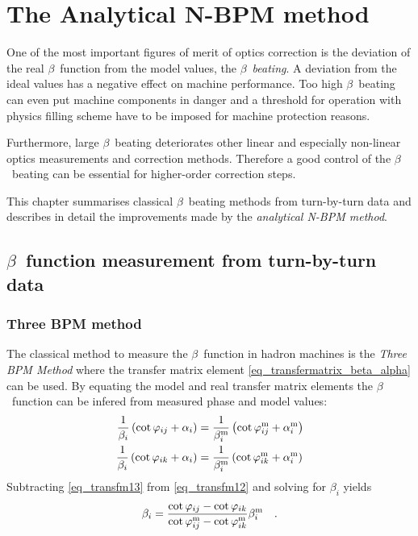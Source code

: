 \chapter{The Analytical N-BPM method}

\begin{chapterinfo}
One of the most important figures of merit of optics correction is the deviation of the real $\beta$~function
from the model values,
the $\beta$~\emph{beating}. A deviation from the ideal values has a negative effect on machine performance.
Too high $\beta$~beating can even put machine components in danger and a threshold for operation with
physics filling scheme have to be imposed for machine protection reasons.

Furthermore, large $\beta$~beating deteriorates other linear and especially non-linear optics measurements
and correction methods. Therefore a good control of the $\beta$~beating can be essential for higher-order
correction steps.

This chapter summarises classical $\beta$~beating methods from turn-by-turn data and describes in
detail the improvements made by the \emph{analytical N-BPM method}.
\end{chapterinfo}

\section{$\beta$~function measurement from turn-by-turn data}

\subsection{Three BPM method}

The classical method to measure the $\beta$~function in hadron machines is the \emph{Three BPM Method}
where the transfer matrix element \eqref{eq_transfermatrix_beta_alpha} can be used. By equating
the model and real transfer matrix elements the $\beta$~function can be infered from measured phase
and model values:
\begin{align}
    \frac{1}{\beta_i} \left( \cot\varphi_{ij} + \alpha_i\right)
    &= \frac{1}{\beta^\text{m}_i} \left(\cot\varphi_{ij}^\text{m} + \alpha_i^\text{m}\right)
    \label{eq_transfm12}\\
    \frac{1}{\beta_i} \left( \cot\varphi_{ik} + \alpha_i\right)
    &= \frac{1}{\beta^\text{m}_i} \left(\cot\varphi_{ik}^\text{m} + \alpha_i^\text{m}\right)
    \label{eq_transfm13}
\end{align}
Subtracting \eqref{eq_transfm13} from \eqref{eq_transfm12} and solving for $\beta_i$ yields
\begin{equation}
    \beta_i = \frac{\cot\varphi_{ij} - \cot{\varphi_{ik}}}{\cot\varphi_{ij}^\text{m} - \cot{\varphi_{ik}^\text{m}}}\beta_i^\text{m}
    \label{eq_three_bpm}
    \quad .
\end{equation}

